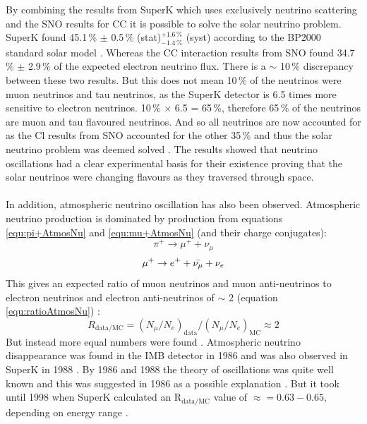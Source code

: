 \\\\By combining the results from SuperK which uses exclusively neutrino scattering and the SNO results for CC it is possible to solve the solar neutrino problem. SuperK found 45.1\,\% $\pm$ 0.5\,\% (stat)$^{+1.6\,\%}_{-1.4\,\%}$ (syst) according to the BP2000 standard solar model \cite{superK2001}. Whereas the CC interaction results from SNO found 34.7\,\% $\pm$ 2.9\,\% of the expected electron neutrino flux\cite{sno2001}. There is a $\sim$ 10\,\% discrepancy between these two results. But this does not mean 10\,\% of the neutrinos were muon neutrinos and tau neutrinos, as the SuperK detector is 6.5 times more sensitive to electron neutrinos. 10\,\% $\times$ 6.5 = 65\,\%, therefore 65\,\% of the neutrinos are muon and tau flavoured neutrinos. And so all neutrinos are now accounted for as the Cl results from SNO accounted for the other 35\,\% and thus the solar neutrino problem was deemed solved  \cite{griffiths2008neutrinoOscillations}. The results showed that neutrino oscillations had a clear experimental basis for their existence proving that the solar neutrinos were changing flavours as they traversed through space. 
\\\\In addition, atmospheric neutrino oscillation has also been observed. Atmospheric neutrino production is dominated by production from equations \ref{equ:pi+AtmosNu} and \ref{equ:mu+AtmosNu} (and their charge conjugates):
\begin{equation}
    \pi^+ \rightarrow \mu^+ + \nu_\mu
    \label{equ:pi+AtmosNu}
\end{equation}
\begin{equation}
    \mu^+ \rightarrow e^+ + \Bar{\nu_\mu} + \nu_e
    \label{equ:mu+AtmosNu}
\end{equation}
This gives an expected ratio of muon neutrinos and muon anti-neutrinos to electron neutrinos and electron anti-neutrinos of $\sim$ 2 (equation \ref{equ:ratioAtmosNu}) \cite{fukuda_skAtmosAnnounce_1998}:
\begin{equation}
    R_{\textrm{data}/\textrm{MC}} = (N_\mu/N_e)_{\textrm{data}}/(N_\mu/N_e)_{\textrm{MC}} \approx 2
    \label{equ:ratioAtmosNu}
\end{equation}
But instead more equal numbers were found \cite{fukuda_skAtmosAnnounce_1998} \cite{KAJITA_sk_atmospheric_2016}. Atmospheric neutrino disappearance was found in the IMB detector in 1986 \cite{tjHaines_AtmosModel_1986} and was also observed in SuperK in 1988 \cite{Hirata_sk_atmosStudy_1988} \cite{KAJITA_sk_atmospheric_2016}. By 1986 and 1988 the theory of oscillations was quite well known and this was suggested in 1986 as a possible explanation \cite{tjHaines_AtmosModel_1986}. But it took until 1998 when SuperK calculated an R$_{\textrm{data}/\textrm{MC}}$ value of $\approx = 0.63 - 0.65$, depending on energy range \cite{fukuda_skAtmosAnnounce_1998}. 
